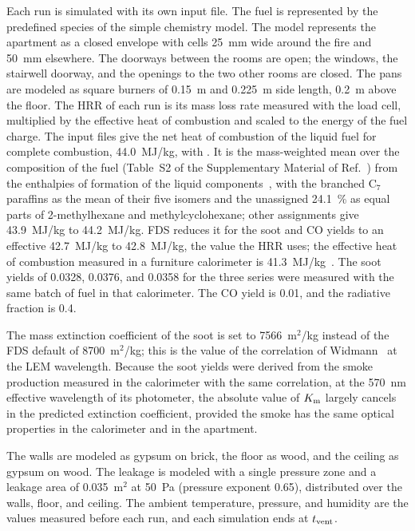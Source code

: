 Each run is simulated with its own input file. The fuel is represented by the predefined species  of the simple chemistry model. The model represents the apartment as a closed envelope with cells 25~mm wide around the fire and 50~mm elsewhere. The doorways between the rooms are open; the windows, the stairwell doorway, and the openings to the two other rooms are closed. The pans are modeled as square burners of 0.15~m and 0.225~m side length, 0.2~m above the floor. The HRR of each run is its mass loss rate measured with the load cell, multiplied by the effective heat of combustion and scaled to the energy of the fuel charge. The input files give the net heat of combustion of the liquid fuel for complete combustion, 44.0~MJ/kg, with . It is the mass-weighted mean over the composition of the fuel (Table~S2 of the Supplementary Material of Ref.~\cite{Osburg:Hasenheide_Paper}) from the enthalpies of formation of the liquid components~\cite{Webbook:NeutralThermo}, with the branched C$_7$ paraffins as the mean of their five isomers and the unassigned 24.1~\% as equal parts of 2-methylhexane and methylcyclohexane; other assignments give 43.9~MJ/kg to 44.2~MJ/kg. FDS reduces it for the soot and CO yields to an effective 42.7~MJ/kg to 42.8~MJ/kg, the value the HRR uses; the effective heat of combustion measured in a furniture calorimeter is 41.3~MJ/kg~\cite{Osburg:Hasenheide_Paper}. The soot yields of 0.0328, 0.0376, and 0.0358 for the three series were measured with the same batch of fuel in that calorimeter. The CO yield is 0.01, and the radiative fraction is 0.4.

The mass extinction coefficient of the soot is set to 7566~m$^2$/kg instead of the FDS default of 8700~m$^2$/kg; this is the value of the correlation of Widmann~\cite{Widmann:CST2003} at the LEM wavelength. Because the soot yields were derived from the smoke production measured in the calorimeter with the same correlation, at the 570~nm effective wavelength of its photometer, the absolute value of $K_{\rm m}$ largely cancels in the predicted extinction coefficient, provided the smoke has the same optical properties in the calorimeter and in the apartment.

The walls are modeled as gypsum on brick, the floor as wood, and the ceiling as gypsum on wood. The leakage is modeled with a single pressure zone and a leakage area of 0.035~m$^2$ at 50~Pa (pressure exponent 0.65), distributed over the walls, floor, and ceiling. The ambient temperature, pressure, and humidity are the values measured before each run, and each simulation ends at $t_{\rm vent}$.

